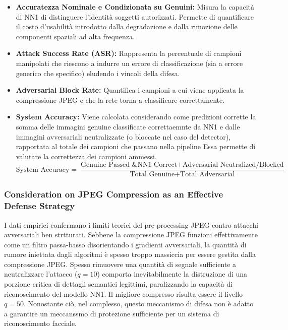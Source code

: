 \documentclass[a4paper, 12pt]{article}
\begin{document}
\begin{itemize}
    \item \textbf{Accuratezza Nominale e Condizionata su Genuini:} Misura la capacità di NN1 di 
    distinguere l'identità soggetti autorizzati. Permette di quantificare il costo d'usabilità introdotto
    dalla degradazione e dalla rimozione delle componenti spaziali  ad alta frequenza.
    \item \textbf{Attack Success Rate (ASR):} Rappresenta la percentuale di campioni manipolati che riescono a 
    indurre un errore di classificazione (sia a errore generico che specifico) eludendo i vincoli della difesa.
    \item \textbf{Adversarial Block Rate:} Quantifica i campioni a cui viene applicata la compressione JPEG e 
    che la rete torna a classificare correttamente.
    \item \textbf{System Accuracy:} Viene calcolata considerando come predizioni corrette la somma delle immagini genuine
    classificate correttaemnte da NN1 e dalle immagini avversariali neutralizzate (o bloccate nel caso del detector),
    rapportata al totale dei campioni che passano nella pipeline Essa permette di valutare la
    correttezza dei campioni ammessi.
    \begin{equation}
        \text{System Accuracy} = \frac{\text{Genuine Passed \& NN1 Correct} + \text{Adversarial Neutralized/Blocked}}{\text{Total Genuine} + \text{Total Adversarial}}
    \end{equation}
\end{itemize}



\vspace{10pt}

\subsubsection{Consideration on JPEG Compression as an Effective Defense Strategy}
I dati empirici confermano i limiti teorici del pre-processing JPEG contro attacchi avversariali 
ben strtturati. Sebbene la compressione JPEG 
funzioni effettivamente come un filtro passa-basso disorientando i gradienti avversariali, la quantità di rumore 
iniettata dagli algoritmi è spesso troppo massiccia per essere gestita dalla compressione JPEG. 
Spesso rimuovere una quantità di segnale sufficiente a neutralizzare l'attacco 
($q=10$) comporta inevitabilmente la distruzione di una porzione critica di dettagli semantici legittimi, paralizzando 
la capacità di riconoscimento del modello NN1. Il migliore compresso risulta essere il livello $q=50$. Nonostante ciò,
nel complesso, questo meccanismo di difesa non è adatto a garantire un meccanssmo di protezione sufficiente 
per un sistema di riconoscimento facciale.
\end{document}

